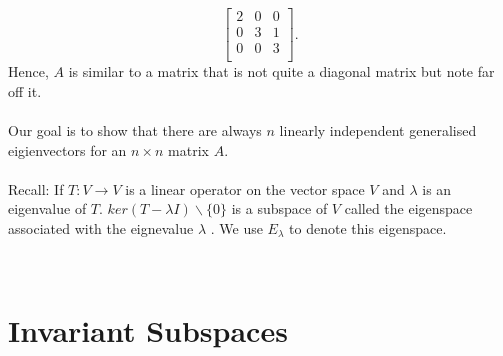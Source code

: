 \documentclass{report}
\begin{document}
{\[\begin{bmatrix}
	 2 & 0 & 0\\
	 0 & 3 & 1\\
	 0 & 0 & 3\\
	 \end{bmatrix}
 .\] 
 Hence, $A$ is similar to a matrix that is not quite a diagonal matrix but note far off it.\\
 \\
 Our goal is to show that there are always $ n$ linearly independent generalised eigienvectors for an $n \times n$  matrix $ A$.\\
 \\
 Recall: If $ T: V \to V$ is a linear operator on the vector space $ V$ and $ \lambda $ is an eigenvalue of $ T$. $ ker \left( T - \lambda I \right) \backslash \{0\} $  is a subspace of $ V$ called the eigenspace associated with the eignevalue $ \lambda$ . We use $ E_{ \lambda}$  to denote this eigenspace.

}

\\
\section{Invariant Subspaces}
	
                   
\end{document}

